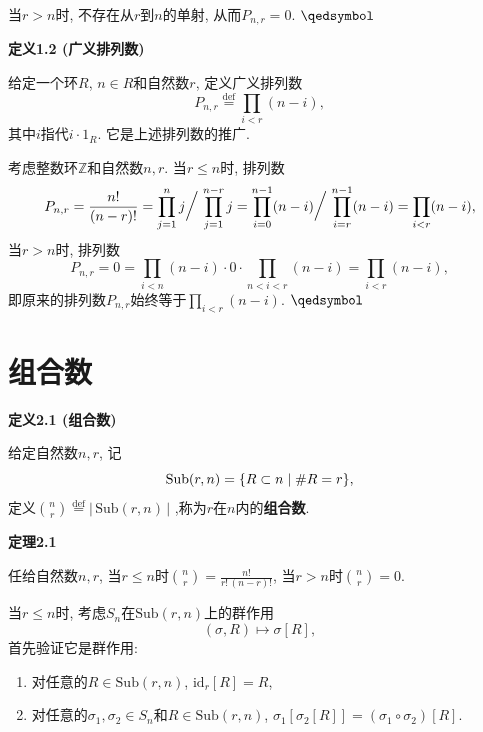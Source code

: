 \documentclass[UTF8]{ctexart}
\begin{document}
\vspace{5pt}
当$r>n$时, 不存在从$r$到$n$的单射, 从而$P_{n,r}=0$. \hfill $\qedsymbol$

\vspace{10pt}

\hypertarget{sec:定义1.2}{}
\noindent\textbf{定义1.2 (广义排列数)}

给定一个环$R$, $n\in R$和自然数$r$, 定义广义排列数
\vspace{3pt}
\[
    P_{n,r}\overset{\mathrm{def}}{=}\prod_{i<r}(n-i),
\]
其中$i$指代$i\cdot 1_R$. 它是上述排列数的推广.


考虑整数环$\mathbb{Z}$和自然数$n,r$. 当$r\leqslant n$时, 排列数
\vspace{3pt}
\[
    P_{n,r}=\frac{n!}{(n-r)!}=\prod_{j=1}^nj\bigg/\,
    \prod_{j=1}^{n-r}j=\prod_{i=0}^{n-1}(n-i)\bigg/\,
    \prod_{i=r}^{n-1}(n-i)=\prod_{i<r}(n-i),\\[3pt]
\]
当$r>n$时, 排列数
\[
    P_{n,r}=0=\prod_{i<n}(n-i)\cdot 0\cdot\prod_{n<i<r}(n-i)
    =\prod_{i<r}(n-i),
\]
即原来的排列数$P_{n,r}$始终等于$\displaystyle\prod_{i<r}(n-i)$.
\hfill $\qedsymbol$





\newpage

\section{组合数}

\hypertarget{sec:定义2.1}{}
\noindent\textbf{定义2.1 (组合数)}

给定自然数$n,r$, 记
\[
    \mathrm{Sub}(r,n)=\{R\subset n\mid\#R=r\},\\[-6pt]
\]
定义$\displaystyle\binom{n}{r}\overset{\mathrm{def}}{=}
|\,\mathrm{Sub}(r,n)\,|$ ,称为$r$在$n$内的\textbf{组合数}.

\vspace{13pt}

\hypertarget{sec:定理2.1}{}
\noindent\textbf{定理2.1}

任给自然数$n,r$, 当$r\leqslant n$时$\displaystyle\binom{n}{r}=
\frac{n!}{r!\,(n-r)!}$, 当$r>n$时$\displaystyle\binom{n}{r}=0$.


当$r\leqslant n$时, 考虑$S_n$在$\mathrm{Sub}(r,n)$上的群作用
\[
    (\sigma,R)\mapsto \sigma[R],
\]
首先验证它是群作用:
\begin{enumerate}
    \item 对任意的$R\in\mathrm{Sub}(r,n)$, $\mathrm{id}_r[R]=R$,
    \item 对任意的$\sigma_1,\sigma_2\in S_n$和$R\in\mathrm{Sub}(r,n)$,
    $\sigma_1[\sigma_2[R]]=(\sigma_1\circ\sigma_2)[R]$.
\end{enumerate}
\end{document}
